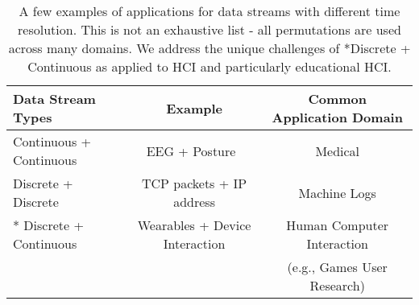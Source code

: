 \begin{table}[h!]
    \centering
    \begin{tabular}{l|c|c}
    Data Stream Types       &  Example & Common Application Domain\\
    \hline
    \phantom{*} Continuous            + Continuous & EEG + Posture~\cite{lara2014general} & Medical \\
    \phantom{*} Discrete\phantom{ous} + Discrete   & TCP packets + IP address & Machine Logs\\
    * Discrete\phantom{ous} + Continuous   & Wearables + Device Interaction & Human Computer Interaction \\ && (e.g., Games User Research)
    \end{tabular}
    \caption{A few examples of applications for data streams with different time resolution. This is not an exhaustive list - all permutations are used across many domains. We address the unique challenges of *Discrete + Continuous as applied to HCI and particularly educational HCI.}
    \label{tab:my_label}
\end{table}